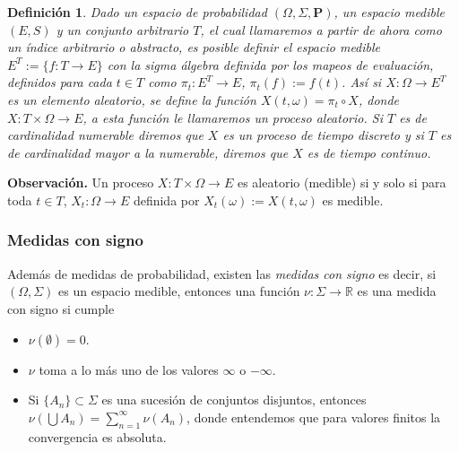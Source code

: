 \documentclass[letterpaper]{article}
\newtheorem{def.}{Definici\'on}[section]
\newcommand{\prob}{\textbf{P}}
\newcommand{\obs}{{\newline \noindent \sc \textbf{Observación. }}}
\newcommand{\om}{\ensuremath{\Omega}}
\newcommand{\sig}{\ensuremath{\Sigma}}
\newcommand{\re}{\ensuremath{\mathbb R }}
\begin{document}
\begin{def.}
Dado un espacio de probabilidad \((\om,\sig,\prob)\), un espacio medible \((E,S)\) y un conjunto arbitrario \(T\), el cual llamaremos a partir de ahora como un \emph{índice arbitrario o abstracto}, es posible definir el espacio medible \(E^{T}:=\{f:T\rightarrow E\}\) con la sigma álgebra definida por los mapeos de evaluación, definidos para cada \(t\in T\) como \(\pi_t:E^{T}\rightarrow E\), \(\pi_t(f):=f(t)\). Así si \(X:\om\rightarrow E^{T}\) es un elemento aleatorio, se define la función \(X(t,\omega)=\pi_t\circ X\), donde \(X:T\times\om\rightarrow E\), a esta función le llamaremos un \emph{proceso aleatorio}. Si \(T\) es de cardinalidad numerable diremos que \(X\) es un proceso de tiempo discreto y si \(T\) es de cardinalidad mayor a la numerable, diremos que \(X\) es de tiempo continuo.
\end{def.}
\obs Un proceso \(X:T\times\om\rightarrow E\) es aleatorio (medible) si y solo si para toda \(t\in T\), \(X_t:\om\rightarrow E\) definida por \(X_t(\omega):=X(t,\omega)\) es medible.

\subsubsection{Medidas con signo}
\label{sec:orgc915f35}

Además de medidas de probabilidad, existen las \emph{medidas con signo} es decir, si \((\Omega,\Sigma)\) es un espacio medible, entonces una función \(\nu:\Sigma\rightarrow\re\) es una medida con signo si cumple

\begin{itemize}
\item \(\nu(\emptyset)=0\).
\item \(\nu\) toma a lo más uno de los valores \(\infty\) o \(-\infty\).
\item Si \(\{A_n\}\subset\Sigma\) es una sucesión de conjuntos disjuntos, entonces \(\nu(\bigcup A_n)=\sum_{n=1}^{\infty} \nu(A_n)\), donde entendemos que para valores finitos la convergencia es absoluta.
\end{itemize}
\end{document}
